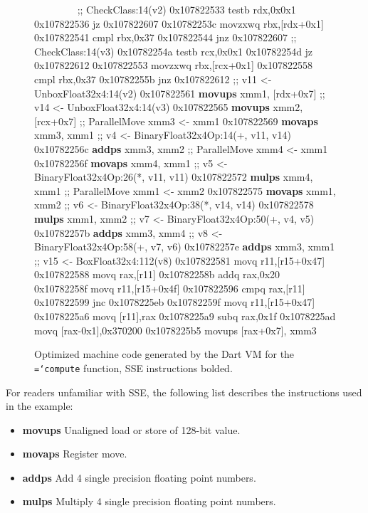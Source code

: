 \documentclass[preprint]{sigplanconf}
\newcommand{\ttt}[1]{{\texttt{\hyphenchar\font=`\-\relax #1}}}%
\begin{document}
\begin{figure}[t]
\begin{small}
\begin{program}[style=tt]
\ \ \ \ \ \ \ \ \tab{}
        ;; CheckClass:14(v2)\untab{}
0x107822533 testb rdx,0x0x1
0x107822536 jz 0x107822607
0x10782253c movzxwq rbx,[rdx+0x1]
0x107822541 cmpl rbx,0x37
0x107822\tab{}544 jnz 0x107822607
        ;; CheckClass:14(v3)\untab{}
0x10782254a testb rcx,0x0x1
0x10782254d jz 0x107822612
0x107822553 movzxwq rbx,[rcx+0x1]
0x107822558 cmpl rbx,0x37
0x107822\tab{}55b jnz 0x107822612
        ;; v11 <- UnboxFloat32x4:14(v2)\untab{}
0x107822\tab{}561 \textbf{movups} xmm1, [rdx+0x7]
        ;; v14 <- UnboxFloat32x4:14(v3)\untab{}
0x107822\tab{}565 \textbf{movups} xmm2, [rcx+0x7]
        ;; ParallelMove xmm3 <- xmm1\untab{}
0x107822\tab{}569 \textbf{movaps} xmm3, xmm1
        ;; v4 <- BinaryFloat32x4Op:14(+, v11, v14)\untab{}
0x107822\tab{}56c \textbf{addps} xmm3, xmm2
        ;; ParallelMove xmm4 <- xmm1\untab{}
0x107822\tab{}56f \textbf{movaps} xmm4, xmm1
        ;; v5 <- BinaryFloat32x4Op:26(*, v11, v11)\untab{}
0x107822\tab{}572 \textbf{mulps} xmm4, xmm1
        ;; ParallelMove xmm1 <- xmm2\untab{}
0x107822\tab{}575 \textbf{movaps} xmm1, xmm2
        ;; v6 <- BinaryFloat32x4Op:38(*, v14, v14)\untab{}
0x107822\tab{}578 \textbf{mulps} xmm1, xmm2
        ;; v7 <- BinaryFloat32x4Op:50(+, v4, v5)\untab{}
0x107822\tab{}57b \textbf{addps} xmm3, xmm4
        ;; v8 <- BinaryFloat32x4Op:58(+, v7, v6)\untab{}
0x107822\tab{}57e \textbf{addps} xmm3, xmm1
        ;; v15 <- BoxFloat32x4:112(v8)\untab{}
0x107822581 movq r11,[r15+0x47]
0x107822588 movq rax,[r11]
0x10782258b addq rax,0x20
0x10782258f movq r11,[r15+0x4f]
0x107822596 cmpq rax,[r11]
0x107822599 jnc 0x1078225eb
0x10782259f  movq r11,[r15+0x47]
0x1078225a6 movq [r11],rax
0x1078225a9 subq rax,0x1f
0x1078225ad movq [rax-0x1],0x370200
0x1078225b5 movups [rax+0x7], xmm3
\end{program}
\end{small}
\caption{Optimized machine code generated by the Dart VM for the \ttt{compute}
function, SSE instructions bolded.}
\label{fig:asm}
\end{figure}

For readers unfamiliar with SSE, the following list describes the instructions
used in the example:

\begin{itemize}
\item \textbf{movups} Unaligned load or store of 128-bit value.
\item \textbf{movaps} Register move.
\item \textbf{addps} Add 4 single precision floating point numbers.
\item \textbf{mulps} Multiply 4 single precision floating point numbers.
\end{itemize}
\end{document}

